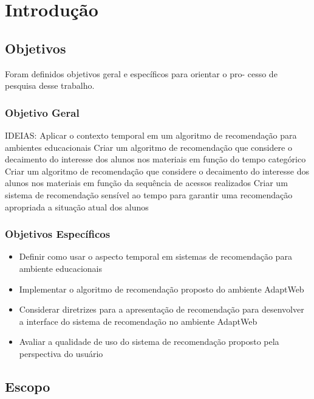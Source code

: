 \chapter{Introdução}\label{introducao}

\section{Objetivos}

Foram definidos objetivos geral e específicos para orientar o pro- cesso de pesquisa desse trabalho.

\subsection{Objetivo Geral}

IDEIAS:
Aplicar o contexto temporal em um algoritmo de recomendação para ambientes educacionais
Criar um algoritmo de recomendação que considere o decaimento do interesse dos alunos nos materiais em função do
tempo categórico
Criar um algoritmo de recomendação que considere o decaimento do interesse dos alunos nos materiais em função da
sequência de acessos realizados
Criar um sistema de recomendação sensível ao tempo para garantir uma recomendação apropriada a situação atual dos alunos

\subsection{Objetivos Específicos}

\begin{itemize}
\item Definir como usar o aspecto temporal em sistemas de recomendação para ambiente educacionais
\item Implementar o algoritmo de recomendação proposto do ambiente AdaptWeb
\item Considerar diretrizes para a apresentação de recomendação para desenvolver a interface do sistema de recomendação
no ambiente AdaptWeb
\item Avaliar a qualidade de uso do sistema de recomendação proposto pela perspectiva do usuário
\end{itemize}

\section{Escopo}

